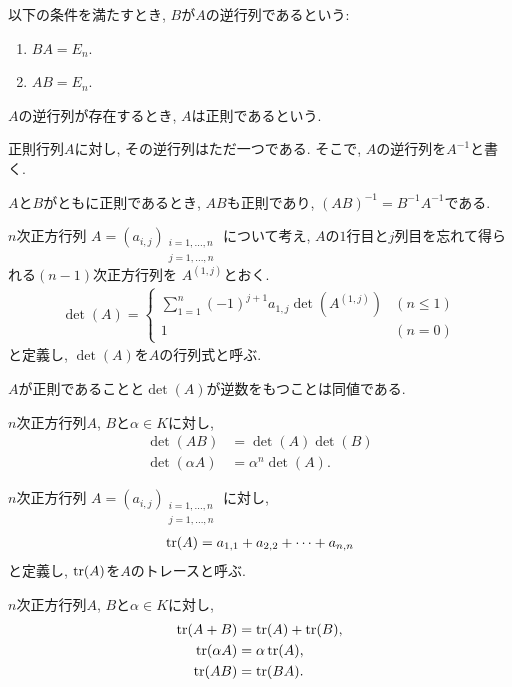 \begin{definition}
  以下の条件を満たすとき,
  $B$が$A$の逆行列であるという:
  \begin{enumerate}
  \item $BA=E_n$.
  \item $AB=E_n$.
  \end{enumerate}
  $A$の逆行列が存在するとき,
  $A$は正則であるという.
\end{definition}
\begin{remark}
  正則行列$A$に対し,
  その逆行列はただ一つである.
  そこで, $A$の逆行列を$A^{-1}$と書く.
\end{remark}
\begin{remark}
  $A$と$B$がともに正則であるとき,
  $AB$も正則であり,
  $(AB)^{-1}=B^{-1}A^{-1}$である.
\end{remark}
\begin{definition}
  $n$次正方行列
  $A=(a_{i,j})_{\substack{i=1,\ldots,n\\j=1,\ldots,n}}$
  について考え,
  $A$の$1$行目と$j$列目を忘れて得られる$(n-1)$次正方行列を
  $A^{(1,j)}$とおく.
  \begin{align*}
    \det(A)=
    \begin{cases}
      \sum_{1=1}^n (-1)^{j+1}a_{1,j}\det (A^{(1,j)})& (n\leq 1)\\
      1& (n=0)
    \end{cases}
  \end{align*}
  と定義し, $\det(A)$を$A$の行列式と呼ぶ.
\end{definition}

\begin{remark}
  $A$が正則であることと$\det(A)$が逆数をもつことは同値である.
\end{remark}

\begin{remark}
  $n$次正方行列$A$, $B$と$\alpha\in K$に対し,
  \begin{align*}
    \det(AB)&=\det(A)\det(B)\\
    \det(\alpha A)&=\alpha^n\det(A).
  \end{align*}
\end{remark}

\begin{definition}
  $n$次正方行列
  $A=(a_{i,j})_{\substack{i=1,\ldots,n\\j=1,\ldots,n}}$
  に対し,
  \begin{align*}
    \operatorname{tr}(A)=a_{1,1}+a_{2,2}+\cdots+a_{n,n}
  \end{align*}
  と定義し, $\operatorname{tr}(A)$を$A$のトレースと呼ぶ.
\end{definition}
\begin{remark}
  $n$次正方行列$A$, $B$と$\alpha\in K$に対し,
  \begin{align*}
    \operatorname{tr}(A+B)&=\operatorname{tr}(A)+\operatorname{tr}(B),\\
    \operatorname{tr}(\alpha A)&=\alpha\operatorname{tr}(A),\\
    \operatorname{tr}(AB)&=\operatorname{tr}(BA).
  \end{align*}
\end{remark}


